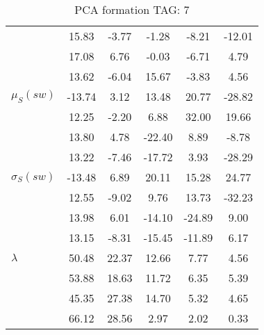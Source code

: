 \begin{table}[h!]
\begin{center}
\begin{tabular}{| l || c | c | c | c | c |}
 & 15.83  & -3.77  & -1.28  & -8.21  & -12.01 \\
 & 17.08  & 6.76  & -0.03  & -6.71  & 4.79 \\
 & 13.62  & -6.04  & 15.67  & -3.83  & 4.56 \\\hline
$\mu_S(sw)$ & -13.74  & 3.12  & 13.48  & 20.77  & -28.82 \\
 & 12.25  & -2.20  & 6.88  & 32.00  & 19.66 \\
 & 13.80  & 4.78  & -22.40  & 8.89  & -8.78 \\
 & 13.22  & -7.46  & -17.72  & 3.93  & -28.29 \\\hline
$\sigma_S(sw)$ & -13.48  & 6.89  & 20.11  & 15.28  & 24.77 \\
 & 12.55  & -9.02  & 9.76  & 13.73  & -32.23 \\
 & 13.98  & 6.01  & -14.10  & -24.89  & 9.00 \\
 & 13.15  & -8.31  & -15.45  & -11.89  & 6.17 \\\hline\hline
$\lambda$ & 50.48  & 22.37  & 12.66  & 7.77  & 4.56 \\
 & 53.88  & 18.63  & 11.72  & 6.35  & 5.39 \\
 & 45.35  & 27.38  & 14.70  & 5.32  & 4.65 \\
 & 66.12  & 28.56  & 2.97  & 2.02  & 0.33 \\\hline
\end{tabular}
\caption{PCA formation TAG: 7}
\end{center}
\end{table}